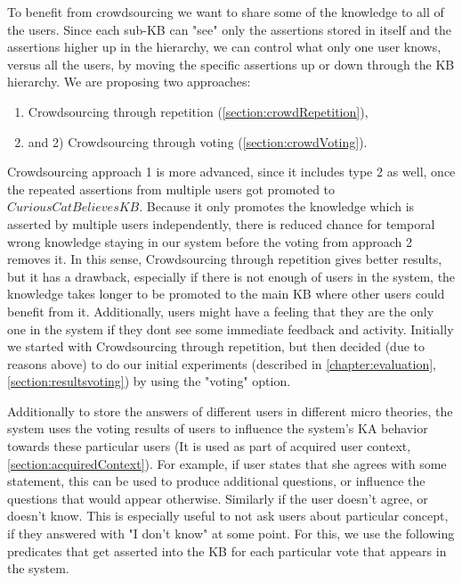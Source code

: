 To benefit from crowdsourcing we want to share some of the knowledge to all of 
the users. Since each sub-KB can "see" only the assertions stored in itself and 
the assertions higher up in the hierarchy, we can control what only one user 
knows, versus all the users, by moving the specific assertions up or down 
through the KB hierarchy. 
We are proposing two approaches: 
\begin{enumerate}
\item Crowdsourcing through repetition (\autoref{section:crowdRepetition}),
\item and 2) Crowdsourcing through voting (\autoref{section:crowdVoting}).
\end{enumerate}
Crowdsourcing approach 1 is more advanced, since it includes type 2 as well, 
once the 
repeated assertions from multiple users got promoted to $CuriousCatBelievesKB$. 
Because it only promotes the knowledge which is asserted by multiple users 
independently, there is reduced chance for temporal wrong knowledge staying in 
our system before the voting from approach 2 removes it. In this sense, 
Crowdsourcing through repetition gives better results, but it has a drawback, 
especially if there is not enough of users in the system, the knowledge takes 
longer to be promoted to the main KB where other users could benefit from it. 
Additionally, users might have a feeling that they are the only one in the 
system if they dont see some immediate feedback and activity. 
Initially we started with Crowdsourcing through repetition, but then 
decided (due to reasons above) to do our initial experiments 
(described in \autoref{chapter:evaluation}, \autoref{section:resultsvoting}) 
by using the "voting" option.

Additionally to store the answers of different users in different micro theories,
the system uses the voting results of users to influence the system's KA 
behavior towards these particular users (It is used as part of acquired user 
context, \autoref{section:acquiredContext}). For example, if user states that 
she agrees with some statement,
this can be used to produce additional questions, or influence the questions
that would appear otherwise. Similarly if the user doesn't agree, or doesn't
know. This is especially useful to not ask users about particular concept, if
they answered with "I don't know" at some point. For this, we use the following
predicates that get asserted into the KB for each particular vote that appears
in the system.

